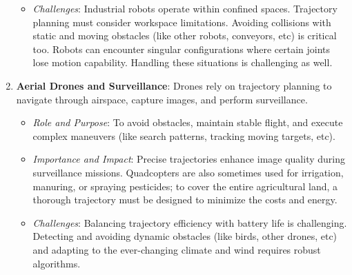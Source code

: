 \documentclass[conference]{IEEEtran}
\begin{document}
\begin{enumerate}
\begin{itemize}
              \item \textit{Challenges}: Industrial robots operate within confined spaces. Trajectory planning must consider workspace limitations. Avoiding collisions with static and moving obstacles (like other robots, conveyors, etc) is critical too. Robots can encounter singular configurations where certain joints lose motion capability. Handling these situations is challenging as well.
          \end{itemize}
    \item \textbf{Aerial Drones and Surveillance}: Drones rely on trajectory planning to navigate through airspace, capture images, and perform surveillance.
          \begin{itemize}
              \item \textit{Role and Purpose}: To avoid obstacles, maintain stable flight, and execute complex maneuvers (like search patterns, tracking moving targets, etc).
              \item \textit{Importance and Impact}: Precise trajectories enhance image quality during surveillance missions. Quadcopters are also sometimes used for irrigation, manuring, or spraying pesticides; to cover the entire agricultural land, a thorough trajectory must be designed to minimize the costs and energy.
              \item \textit{Challenges}: Balancing trajectory efficiency with battery life is challenging. Detecting and avoiding dynamic obstacles (like birds, other drones, etc) and adapting to the ever-changing climate and wind requires robust algorithms.
          \end{itemize}
\end{enumerate}

\end{document}
